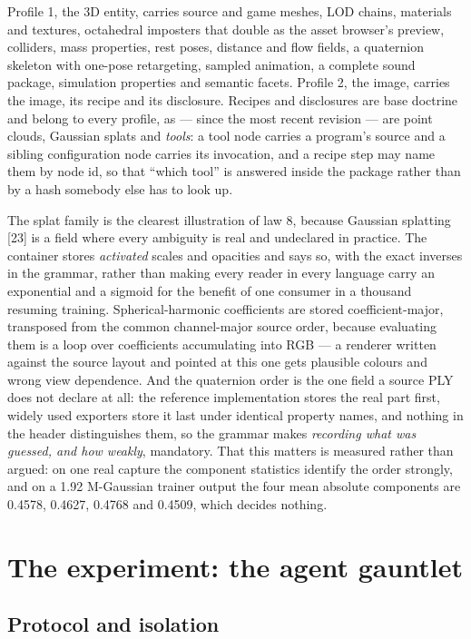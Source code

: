 \documentclass[10pt,twocolumn,letterpaper]{article}
\begin{document}
Profile 1, the 3D entity, carries source and game meshes, LOD chains, materials and textures, octahedral imposters that double as the asset browser's preview, colliders, mass properties, rest poses, distance and flow fields, a quaternion skeleton with one-pose retargeting, sampled animation, a complete sound package, simulation properties and semantic facets. Profile 2, the image, carries the image, its recipe and its disclosure. Recipes and disclosures are base doctrine and belong to every profile, as --- since the most recent revision --- are point clouds, Gaussian splats and \emph{tools}: a tool node carries a program's source and a sibling configuration node carries its invocation, and a recipe step may name them by node id, so that ``which tool'' is answered inside the package rather than by a hash somebody else has to look up.

The splat family is the clearest illustration of law 8, because Gaussian splatting [23] is a field where every ambiguity is real and undeclared in practice. The container stores \emph{activated} scales and opacities and says so, with the exact inverses in the grammar, rather than making every reader in every language carry an exponential and a sigmoid for the benefit of one consumer in a thousand resuming training. Spherical-harmonic coefficients are stored coefficient-major, transposed from the common channel-major source order, because evaluating them is a loop over coefficients accumulating into RGB --- a renderer written against the source layout and pointed at this one gets plausible colours and wrong view dependence. And the quaternion order is the one field a source PLY does not declare at all: the reference implementation stores the real part first, widely used exporters store it last under identical property names, and nothing in the header distinguishes them, so the grammar makes \emph{recording what was guessed, and how weakly}, mandatory. That this matters is measured rather than argued: on one real capture the component statistics identify the order strongly, and on a 1.92 M-Gaussian trainer output the four mean absolute components are 0.4578, 0.4627, 0.4768 and 0.4509, which decides nothing.

\section{The experiment: the agent gauntlet}

\subsection{Protocol and isolation}
\end{document}
